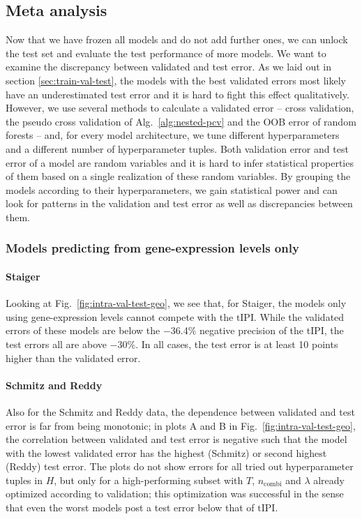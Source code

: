 \subsection{Meta analysis}\label{subsec:results-intra-meta}

Now that we have frozen all models and do not add further ones, we can unlock the test set and 
evaluate the test performance of more models. We want to examine the discrepancy between 
validated and test error. As we laid out in section \ref{sec:train-val-test}, the models with the 
best validated errors most likely have an underestimated test error and it is hard to fight this 
effect qualitatively. However, we use several methods to calculate a validated error -- cross 
validation, the pseudo cross validation of Alg.\ \ref{alg:nested-pcv} and the OOB error of random 
forests -- and, for every model architecture, we tune different hyperparameters and a different 
number of hyperparameter tuples. Both validation error and test error of a model are random 
variables and it is hard to infer statistical properties of them based on a single realization of 
these random variables. By grouping the models according to their hyperparameters, we gain 
statistical power and can look for patterns in the validation and test error as well as 
discrepancies between them.

\subsubsection{Models predicting from gene-expression levels only}



\paragraph{Staiger}
Looking at Fig.\ \ref{fig:intra-val-test-geo}, we see that, for Staiger, the models only using 
gene-expression levels cannot compete with the $\text{tIPI}$. While the validated errors of these 
models are 
below the \num{-36.4}\% negative precision of the tIPI, the test errors all are above \num{-30}\%. 
In all cases, the test error is at least 10 points higher than the validated error.  

\paragraph{Schmitz and Reddy}
Also for the Schmitz and Reddy data, the dependence between validated and test error is far from 
being monotonic; in plots A and B in Fig.\ \ref{fig:intra-val-test-geo}, the
correlation between validated and test 
error is negative such that the model with the lowest validated error has the highest 
(Schmitz) or second highest (Reddy) test error. The plots do not show errors for all tried out 
hyperparameter tuples in $H$, but only for a high-performing subset with $T$, $n_\text{combi}$ 
and $\lambda$ already 
optimized according to validation; this optimization was successful in the sense that even the 
worst models post a test error below that of $\text{tIPI}$.

